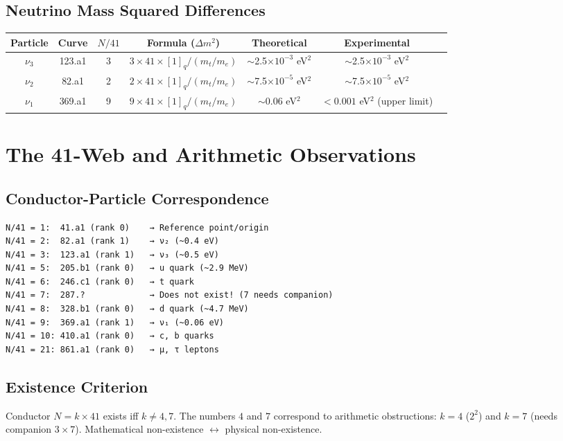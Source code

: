 ﻿\documentclass[11pt,a4paper]{article}
\theoremstyle{definition}
\begin{document}
\subsection{Neutrino Mass Squared Differences}
\begin{table}[h]
\centering
\begin{tabular}{@{}ccccccc@{}}
\toprule
\textbf{Particle} & \textbf{Curve} & $N/41$ & \textbf{Formula ($\Delta m^2$)} & \textbf{Theoretical} & \textbf{Experimental} \\
\midrule
$\nu_3$ & 123.a1 & 3 & $3\times41 \times [1]_q / (m_t/m_e)$ & $\sim$2.5$\times10^{-3}$ eV$^2$ & $\sim$2.5$\times10^{-3}$ eV$^2$ \\
$\nu_2$ & 82.a1 & 2 & $2\times41 \times [1]_q / (m_t/m_e)$ & $\sim$7.5$\times10^{-5}$ eV$^2$ & $\sim$7.5$\times10^{-5}$ eV$^2$ \\
$\nu_1$ & 369.a1 & 9 & $9\times41 \times [1]_q / (m_t/m_e)$ & $\sim$0.06 eV$^2$ & $<0.001$ eV$^2$ (upper limit) \\
\bottomrule
\end{tabular}
\end{table}

\section{The 41-Web and Arithmetic Observations}

\subsection{Conductor-Particle Correspondence}
\begin{verbatim}
N/41 = 1:  41.a1 (rank 0)    → Reference point/origin
N/41 = 2:  82.a1 (rank 1)    → ν₂ (~0.4 eV)
N/41 = 3:  123.a1 (rank 1)   → ν₃ (~0.5 eV)
N/41 = 5:  205.b1 (rank 0)   → u quark (~2.9 MeV)
N/41 = 6:  246.c1 (rank 0)   → t quark
N/41 = 7:  287.?             → Does not exist! (7 needs companion)
N/41 = 8:  328.b1 (rank 0)   → d quark (~4.7 MeV)
N/41 = 9:  369.a1 (rank 1)   → ν₁ (~0.06 eV)
N/41 = 10: 410.a1 (rank 0)   → c, b quarks
N/41 = 21: 861.a1 (rank 0)   → μ, τ leptons
\end{verbatim}

\subsection{Existence Criterion}
Conductor $N = k \times 41$ exists iff $k \neq 4,7$. The numbers $4$ and $7$ correspond to arithmetic obstructions: $k=4$ ($2^2$) and $k=7$ (needs companion $3\times7$). Mathematical non-existence $\leftrightarrow$ physical non-existence.
\end{document}
